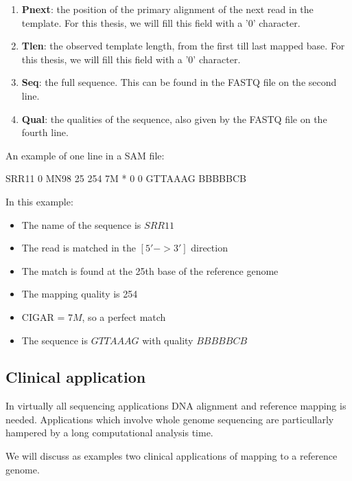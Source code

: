 \begin{enumerate}
	\item \textbf{Pnext}: the position of the primary alignment of the next read in the template. For this thesis, we will fill this field with a '0' character.
	
	\item \textbf{Tlen}: the observed template length, from the first till last mapped base. For this thesis, we will fill this field with a '0' character.
	
	\item \textbf{Seq}: the full sequence. This can be found in the FASTQ file on the second line.
	
	\item \textbf{Qual}: the qualities of the sequence, also given by the FASTQ file on the fourth line.
	
\end{enumerate}

An example of one line in a SAM file:
\begin{lcverbatim}
SRR11   0   MN98   25   254   7M   *   0   0   GTTAAAG   BBBBBCB
\end{lcverbatim}
In this example:
\begin{itemize}
	\item The name of the sequence is $SRR11$
	\item The read is matched in the $[5' -> 3']$ direction
	\item The match is found at the 25th base of the reference genome
	\item The mapping quality is 254
	\item CIGAR = $7M$, so a perfect match
	\item The sequence is $GTTAAAG$ with quality $BBBBBCB$
\end{itemize}

\subsection{Clinical application}

In virtually all sequencing applications DNA alignment and reference mapping is needed. Applications which involve whole genome sequencing are particullarly hampered by a long computational analysis time.

We will discuss as examples two clinical applications of mapping to a reference genome.

